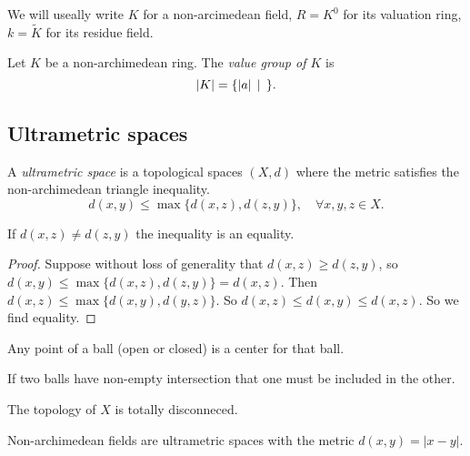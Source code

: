 We will useally write $K$ for a non-arcimedean field, $R = K^{0}$ for its valuation ring, $k = \tilde K$ for its residue field. 

\begin{definition}
	Let $K$ be a non-archimedean ring. 
	The \emph{value group of $K$} is \[
	|K| = \{|a| \st \} 
	.\] 
\end{definition}


\subsection{Ultrametric spaces} \label{sec:ultrametric_spaces}

\begin{definition}
	A \emph{ultrametric space} is a topological spaces $(X, d)$ where the metric satisfies the non-archimedean triangle inequality. 
	\[
		d(x, y) \le \max \{d(x, z) ,d(z, y)\}, \quad \forall x, y ,z \in X
	.\] 
\end{definition}
\begin{exercise}
	If $d(x,z) \ne d(z,y)$ the inequality is an equality. 
\end{exercise}
\begin{proof}
	Suppose without loss of generality that $d(x, z) \ge d(z,y)$, so $d(x, y) \le \max \{d(x, z), d(z,y)\} = d(x, z) $. 
	Then $d(x, z) \le \max \{d(x, y), d(y,z)\}$. So $d(x, z) \le d(x, y) \le d(x, z)$. So we find equality.
\end{proof}
\begin{corollary}
	Any point of a ball (open or closed) is a center for that ball. 
\end{corollary}
\begin{corollary}
	If two balls have non-empty intersection that one must be included in the other. 
\end{corollary}
\begin{corollary}
	The topology of $X$ is totally disconneced. 
\end{corollary}

Non-archimedean fields are ultrametric spaces with the metric $d(x, y) = |x - y|$. 

